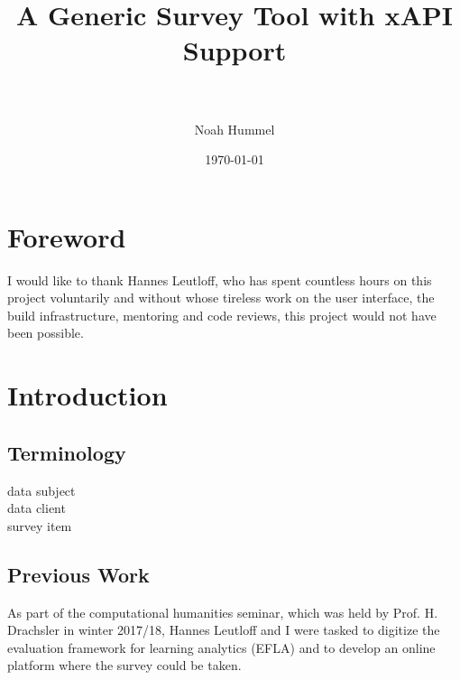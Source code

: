 \documentclass[a4paper,11pt]{article}
\title{A Generic Survey Tool with xAPI Support \\ \\ }
\date{\today}
\author{Noah Hummel}
\newcommand{\profhd}{Prof. H. Drachsler }
\begin{document}
        \tableofcontents
        \pagebreak
    
        \section{Foreword}
            I would like to thank Hannes Leutloff, who has spent countless hours
            on this project voluntarily and without whose tireless work on
            the user interface, the build infrastructure, mentoring and code reviews, 
            this project would not have been possible.

        \section{Introduction}
        \subsection{Terminology}
        \begin{description}
            \item[data subject]
            \item[data client]
            \item[survey item]
        \end{description}

        \subsection{Previous Work}
            As part of the computational humanities seminar, which was held by \profhd in winter 2017/18, Hannes Leutloff
            and I were tasked to digitize the evaluation framework for learning analytics (EFLA) \cite{efla} and to
            develop an online platform where the survey could be taken.
\end{document}

